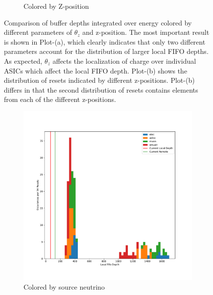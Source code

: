 \begin{figure}
\begin{subfigure}{.5\textwidth}
  \caption{Colored by Z-position}
\end{subfigure}
\caption{Comparison of buffer depths integrated over energy colored by different parameters of $\theta_{z}$ and z-position.
The most important result is shown in Plot-(a), which clearly indicates that only two different parameters account for the distribution of larger local FIFO depths.
As expected, $\theta_{z}$ affects the localization of charge over individual ASICs which affect the local FIFO depth.
Plot-(b) shows the distribution of resets indicated by different z-positions.
Plot-(b) differs in that the second distribution of resets contains elements from each of the different z-positions.
}
\label{fig:compare_integral_zpos_theta}
\end{figure}

\begin{figure}
\centering
\begin{subfigure}{.5\textwidth}
  \centering
  \includegraphics[width=\textwidth]{images/df_pdg_cut.pdf}
  \caption{Colored by source neutrino}
\end{subfigure}%
\begin{subfigure}{.5\textwidth}
  \centering

\end{subfigure}
\end{figure}
